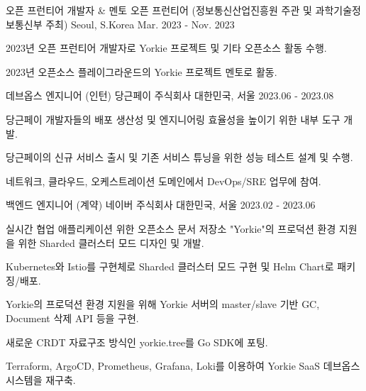 

\begin{cventries}

\cventry
    {오픈 프런티어 개발자 \& 멘토} %
    {오픈 프런티어 (정보통신산업진흥원 주관 및 과학기술정보통신부 주최)} %
    {Seoul, S.Korea} %
    {Mar. 2023 - Nov. 2023} %
    {
      \begin{cvitems} %
        \item {2023년 오픈 프런티어 개발자로 Yorkie 프로젝트 및 기타 오픈소스 활동 수행.}
        \item {2023년 오픈소스 플레이그라운드의 Yorkie 프로젝트 멘토로 활동.}
      \end{cvitems}
    }

  \cventry
    {데브옵스 엔지니어 (인턴)} %
    {당근페이 주식회사} %
    {대한민국, 서울} %
    {2023.06 - 2023.08} %
    {
      \begin{cvitems} %
        \item {당근페이 개발자들의 배포 생산성 및 엔지니어링 효율성을 높이기 위한 내부 도구 개발.}
        \item {당근페이의 신규 서비스 출시 및 기존 서비스 튜닝을 위한 성능 테스트 설계 및 수행.}
        \item {네트워크, 클라우드, 오케스트레이션 도메인에서 DevOps/SRE 업무에 참여.}
      \end{cvitems}
    }

  \cventry
    {백엔드 엔지니어 (계약)} %
    {네이버 주식회사} %
    {대한민국, 서울} %
    {2023.02 - 2023.06} %
    {
      \begin{cvitems} %
        \item {실시간 협업 애플리케이션 위한 오픈소스 문서 저장소 "Yorkie"의 프로덕션 환경 지원을 위한 Sharded 클러스터 모드 디자인 및 개발.}
        \item {Kubernetes와 Istio를 구현체로 Sharded 클러스터 모드 구현 및 Helm Chart로 패키징/배포.}
        \item {Yorkie의 프로덕션 환경 지원을 위해 Yorkie 서버의 master/slave 기반 GC, Document 삭제 API 등을 구현.}      
        \item {새로운 CRDT 자료구조 방식인 yorkie.tree를 Go SDK에 포팅.}  
        \item {Terraform, ArgoCD, Prometheus, Grafana, Loki를 이용하여 Yorkie SaaS 데브옵스 시스템을 재구축.}
      \end{cvitems}
    }


\end{cventries}
